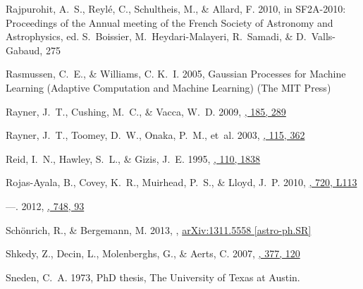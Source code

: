 \documentclass[iop,floatfix,numberedappendix,twocolappendix]{emulateapj}
\begin{document}
\begin{thebibliography}{48}
{Rajpurohit}, A.~S., {Reyl\'{e}}, C., {Schultheis}, M., \& {Allard}, F. 2010,
  in {SF2A-2010: Proceedings of the Annual meeting of the French Society of
  Astronomy and Astrophysics}, ed. S.~{Boissier}, M.~{Heydari-Malayeri},
  R.~{Samadi}, \& D.~{Valls-Gabaud}, 275

Rasmussen, C.~E., \& Williams, C. K.~I. 2005, {Gaussian Processes for Machine
  Learning (Adaptive Computation and Machine Learning)} (The MIT Press)

{Rayner}, J.~T., {Cushing}, M.~C., \& {Vacca}, W.~D. 2009,
  \href{http://dx.doi.org/10.1088/0067-0049/185/2/289}{\JournalTitle{\apjs},
  185, 289}

{Rayner}, J.~T., {Toomey}, D.~W., {Onaka}, P.~M., {et~al.} 2003,
  \href{http://dx.doi.org/10.1086/367745}{\JournalTitle{\pasp}, 115, 362}

{Reid}, I.~N., {Hawley}, S.~L., \& {Gizis}, J.~E. 1995,
  \href{http://dx.doi.org/10.1086/117655}{\JournalTitle{\aj}, 110, 1838}

{Rojas-Ayala}, B., {Covey}, K.~R., {Muirhead}, P.~S., \& {Lloyd}, J.~P. 2010,
  \href{http://dx.doi.org/10.1088/2041-8205/720/1/L113}{\JournalTitle{\apjl},
  720, L113}

---. 2012,
  \href{http://dx.doi.org/10.1088/0004-637X/748/2/93}{\JournalTitle{\apj}, 748,
  93}

{Sch\"{o}nrich}, R., \& {Bergemann}, M. 2013, ,
  \href{http://arxiv.org/abs/1311.5558}{{\sffamily arXiv:1311.5558
  [astro-ph.SR]}}

{Shkedy}, Z., {Decin}, L., {Molenberghs}, G., \& {Aerts}, C. 2007,
  \href{http://dx.doi.org/10.1111/j.1365-2966.2007.11508.x}{\JournalTitle{\mnras},
  377, 120}

{Sneden}, C.~A. 1973, PhD thesis, The University of Texas at Austin.


\end{thebibliography}
\end{document}
